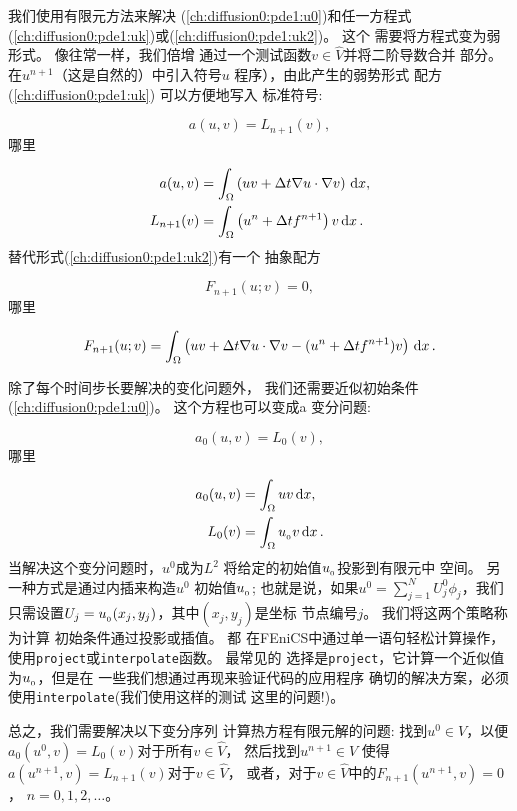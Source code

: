 我们使用有限元方法来解决
(\ref{ch:diffusion0:pde1:u0})和任一方程式
(\ref{ch:diffusion0:pde1:uk})或(\ref{ch:diffusion0:pde1:uk2})。 这个
需要将方程式变为弱形式。 像往常一样，我们倍增
通过一个测试函数$v\in \hat V$并将二阶导数合并
部分。 在$u^{n+1}$（这是自然的）中引入符号$u$
程序），由此产生的弱势形式
配方(\ref{ch:diffusion0:pde1:uk})
可以方便地写入
标准符号:

\[ a(u,v)=L_{n+1}(v),\]
哪里

\begin{align}
a(u,v) &= \int_\Omega\left(uv + {\Delta t}
\nabla u\cdot \nabla v\right) \, \mathrm{d}x, \label{ch:diffusion0:pde1:a}\\
L_{n+1}(v) &= \int_\Omega \left(u^n + {\Delta t}  f^{n+1}\right)v \, \mathrm{d}x\thinspace .
\label{ch:diffusion0:pde1:L}
\end{align}
替代形式(\ref{ch:diffusion0:pde1:uk2})有一个
抽象配方

\[ F_{n+1}(u;v) = 0,\]
哪里

\begin{equation}
F_{n+1}(u; v) = \int_\Omega \left(uv + {\Delta t}
\nabla u\cdot \nabla v -
(u^n + {\Delta t} f^{n+1})v\right) \, \mathrm{d}x\thinspace .
\label{ch:diffusion0:pde1:F}
\end{equation}

除了每个时间步长要解决的变化问题外，
我们还需要近似初始条件
(\ref{ch:diffusion0:pde1:u0})。 这个方程也可以变成a
变分问题:

\[ a_0(u,v)=L_0(v),\]
哪里

\begin{align}
a_0(u,v) &= \int_\Omega uv \, \mathrm{d}x, \label{ch:diffusion0:pde1:a0}\\
L_0(v) &= \int_\Omega u_{_0} v \, \mathrm{d}x\thinspace . \label{ch:diffusion0:pde1:L0}
\end{align}
当解决这个变分问题时，$u^0$成为$L^2$
将给定的初始值$u_{_0}$投影到有限元中
空间。 另一种方式是通过内插来构造$u^0$
初始值$u_{_0}$; 也就是说，如果$u^0=\sum_{j=1}^N U^0_j\phi_j$，我们
只需设置$U_j=u_{_0}(x_j,y_j)$，其中$(x_j,y_j)$是坐标
节点编号$j$。 我们将这两个策略称为计算
初始条件通过投影或插值。 都
在FEniCS中通过单一语句轻松计算操作，
使用\texttt{project}或\texttt{interpolate}函数。 最常见的
选择是\texttt{project}，它计算一个近似值为$u_{_0}$，但是在
一些我们想通过再现来验证代码的应用程序
确切的解决方案，必须使用\texttt{interpolate}(我们使用这样的测试
这里的问题!)。


总之，我们需要解决以下变分序列
计算热方程有限元解的问题:
找到$u^0\in V$，以便$a_0(u^0,v)=L_0(v)$对于所有$v\in\hat V$，
然后找到$u^{n+1}\in V$
使得$a(u^{n+1},v)=L_{n+1}(v)$对于$v\in\hat V$，
或者，对于$v\in\hat V$中的$F_{n+1}(u^{n+1},v)=0$，
$n=0,1,2,\ldots$。

